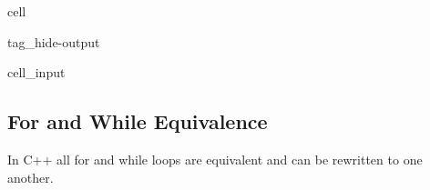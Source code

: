 \documentclass[a4paper,10pt,english]{jupyterBook}
\begin{document}
\begin{sphinxuseclass}{cell}
\begin{sphinxuseclass}{tag_hide-output}\begin{sphinxVerbatimInput}

\begin{sphinxuseclass}{cell_input}
\begin{sphinxVerbatim}[commandchars=\\\{\}]


\end{sphinxVerbatim}

\end{sphinxuseclass}\end{sphinxVerbatimInput}

\end{sphinxuseclass}
\end{sphinxuseclass}

\subsection{For and While Equivalence}
\label{\detokenize{text/progtut/for:for-and-while-equivalence}}
\sphinxAtStartPar
In C++ all for and while loops are equivalent and can be rewritten to one another.
\end{document}
